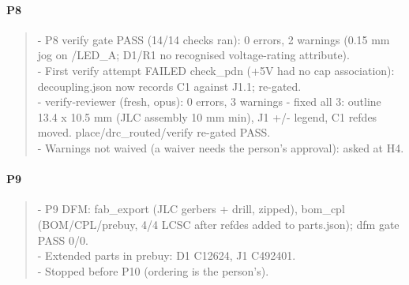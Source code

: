 \documentclass[11pt]{article}
\begin{document}
\paragraph*{P8}
\begin{quote}\small\ttfamily\raggedright
- P8 verify gate PASS (14/14 checks ran): 0 errors, 2 warnings (0.15 mm jog on /LED\_A; D1/R1 no recognised voltage-rating attribute).\\
- First verify attempt FAILED check\_pdn (+5V had no cap association): decoupling.json now records C1 against J1.1; re-gated.\\
- verify-reviewer (fresh, opus): 0 errors, 3 warnings - fixed all 3: outline 13.4 x 10.5 mm (JLC assembly 10 mm min), J1 +/- legend, C1 refdes moved. place/drc\_routed/verify re-gated PASS.\\
- Warnings not waived (a waiver needs the person's approval): asked at H4.
\end{quote}
\paragraph*{P9}
\begin{quote}\small\ttfamily\raggedright
- P9 DFM: fab\_export (JLC gerbers + drill, zipped), bom\_cpl (BOM/CPL/prebuy, 4/4 LCSC after refdes added to parts.json); dfm gate PASS 0/0.\\
- Extended parts in prebuy: D1 C12624, J1 C492401.\\
- Stopped before P10 (ordering is the person's).
\end{quote}
\end{document}
